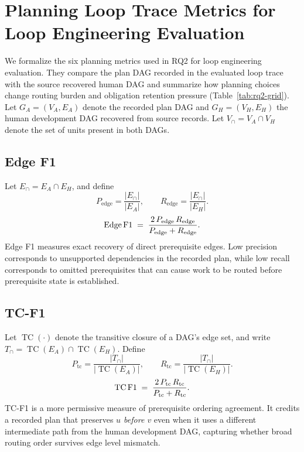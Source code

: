 \section{Planning Loop Trace Metrics for Loop Engineering Evaluation}\label{app:planning-metrics}

We formalize the six planning metrics used in RQ2 for loop engineering evaluation. They compare the plan DAG recorded in the evaluated loop trace with the source recovered human DAG and summarize how planning choices change routing burden and obligation retention pressure (Table~\ref{tab:rq2-grid}). Let $G_A = (V_A, E_A)$ denote the recorded plan DAG and $G_H = (V_H, E_H)$ the human development DAG recovered from source records. Let $V_\cap = V_A \cap V_H$ denote the set of units present in both DAGs.

\subsection{Edge F1}\label{app:edge-f1}
Let $E_\cap = E_A \cap E_H$, and define
\begin{equation}
P_{\text{edge}} = \frac{|E_\cap|}{|E_A|}, \qquad R_{\text{edge}} = \frac{|E_\cap|}{|E_H|}.
\end{equation}
\begin{equation}
\text{Edge\,F1} \;=\; \frac{2\,P_{\text{edge}}\,R_{\text{edge}}}{P_{\text{edge}} + R_{\text{edge}}}.
\end{equation}
Edge F1 measures exact recovery of direct prerequisite edges. Low precision corresponds to unsupported dependencies in the recorded plan, while low recall corresponds to omitted prerequisites that can cause work to be routed before prerequisite state is established.

\subsection{TC-F1}\label{app:tc-f1}
Let $\operatorname{TC}(\cdot)$ denote the transitive closure of a DAG's edge set, and write $T_\cap = \operatorname{TC}(E_A) \cap \operatorname{TC}(E_H)$. Define
\begin{equation}
P_{\text{tc}} = \frac{|T_\cap|}{|\operatorname{TC}(E_A)|}, \qquad R_{\text{tc}} = \frac{|T_\cap|}{|\operatorname{TC}(E_H)|}.
\end{equation}
\begin{equation}
\text{TC\,F1} \;=\; \frac{2\,P_{\text{tc}}\,R_{\text{tc}}}{P_{\text{tc}} + R_{\text{tc}}}.
\end{equation}
TC-F1 is a more permissive measure of prerequisite ordering agreement. It credits a recorded plan that preserves \emph{$u$ before $v$} even when it uses a different intermediate path from the human development DAG, capturing whether broad routing order survives edge level mismatch.

